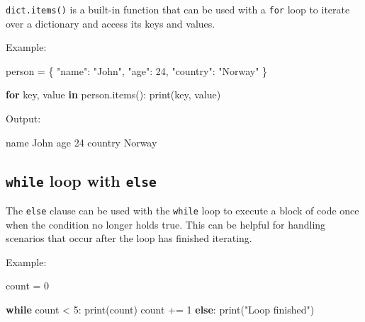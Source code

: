 \documentclass[
  paper=a4,
  ,captions=tableheading
]{scrartcl}
\newenvironment{Shaded}{}{}
\newcommand{\BuiltInTok}[1]{\textcolor[rgb]{0.00,0.50,0.00}{#1}}
\newcommand{\ControlFlowTok}[1]{\textcolor[rgb]{0.00,0.44,0.13}{\textbf{#1}}}
\newcommand{\DecValTok}[1]{\textcolor[rgb]{0.25,0.63,0.44}{#1}}
\newcommand{\ExtensionTok}[1]{#1}
\newcommand{\KeywordTok}[1]{\textcolor[rgb]{0.00,0.44,0.13}{\textbf{#1}}}
\newcommand{\NormalTok}[1]{#1}
\newcommand{\OperatorTok}[1]{\textcolor[rgb]{0.40,0.40,0.40}{#1}}
\newcommand{\StringTok}[1]{\textcolor[rgb]{0.25,0.44,0.63}{#1}}
\begin{document}
\texttt{dict.items()} is a built-in function that can be used with a
\texttt{for} loop to iterate over a dictionary and access its keys and
values.

Example:

\begin{Shaded}
\begin{Highlighting}[]
\NormalTok{person }\OperatorTok{=}\NormalTok{ \{}
    \StringTok{"name"}\NormalTok{: }\StringTok{"John"}\NormalTok{,}
    \StringTok{"age"}\NormalTok{: }\DecValTok{24}\NormalTok{,}
    \StringTok{"country"}\NormalTok{: }\StringTok{"Norway"}
\NormalTok{\}}

\ControlFlowTok{for}\NormalTok{ key, value }\KeywordTok{in}\NormalTok{ person.items():}
    \BuiltInTok{print}\NormalTok{(key, value)}
\end{Highlighting}
\end{Shaded}

Output:

\begin{Shaded}
\begin{Highlighting}[]
\ExtensionTok{name}\NormalTok{ John}
\ExtensionTok{age}\NormalTok{ 24}
\ExtensionTok{country}\NormalTok{ Norway}
\end{Highlighting}
\end{Shaded}

\hypertarget{while-loop-with-else}{%
\subsection{\texorpdfstring{\texttt{while} loop with
\texttt{else}}{while loop with else}}\label{while-loop-with-else}}

The \texttt{else} clause can be used with the \texttt{while} loop to
execute a block of code once when the condition no longer holds true.
This can be helpful for handling scenarios that occur after the loop has
finished iterating.

Example:

\begin{Shaded}
\begin{Highlighting}[]

\NormalTok{count }\OperatorTok{=} \DecValTok{0}

\ControlFlowTok{while}\NormalTok{ count }\OperatorTok{\textless{}} \DecValTok{5}\NormalTok{:}
    \BuiltInTok{print}\NormalTok{(count)}
\NormalTok{    count }\OperatorTok{+=} \DecValTok{1}
\ControlFlowTok{else}\NormalTok{:}
    \BuiltInTok{print}\NormalTok{(}\StringTok{"Loop finished"}\NormalTok{)}
\end{Highlighting}
\end{Shaded}
\end{document}
